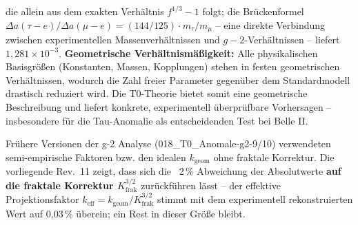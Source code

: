 		die allein aus dem exakten Verhältnis $f^{1/3} - 1$ folgt; die Brückenformel $\Delta a(\tau{-}e)/\Delta a(\mu{-}e) = (144/125) \cdot m_\tau/m_\mu$ -- eine direkte Verbindung zwischen experimentellen Massenverhältnissen und $g-2$-Verhältnissen -- liefert $1{,}281 \times 10^{-3}$.
		\textbf{Geometrische Verhältnismäßigkeit:} Alle physikalischen Basisgrößen (Konstanten, Massen, Kopplungen) stehen in festen geometrischen Verhältnissen, wodurch die Zahl freier Parameter gegenüber dem Standardmodell drastisch reduziert wird. Die T0-Theorie bietet somit eine geometrische Beschreibung und liefert konkrete, experimentell überprüfbare Vorhersagen – insbesondere für die Tau-Anomalie als entscheidenden Test bei Belle II.

	
	\begin{tcolorbox}[colback=yellow!10!white, colframe=orange!75!black, title=Hinweis zu älteren Dokumenten]
		Frühere Versionen der g-2 Analyse (018\_T0\_Anomale-g2-9/10) verwendeten semi-empirische Faktoren bzw. den idealen $k_\text{geom}$ ohne fraktale Korrektur. Die vorliegende Rev.~11 zeigt, dass sich die ~2\,\% Abweichung der Absolutwerte \textbf{auf die fraktale Korrektur $K_\text{frak}^{3/2}$} zurückführen lässt – der effektive Projektionsfaktor $k_\text{eff} = k_\text{geom}/K_\text{frak}^{3/2}$ stimmt mit dem experimentell rekonstruierten Wert auf 0{,}03\,\% überein; ein Rest in dieser Größe bleibt.
	\end{tcolorbox}
	
